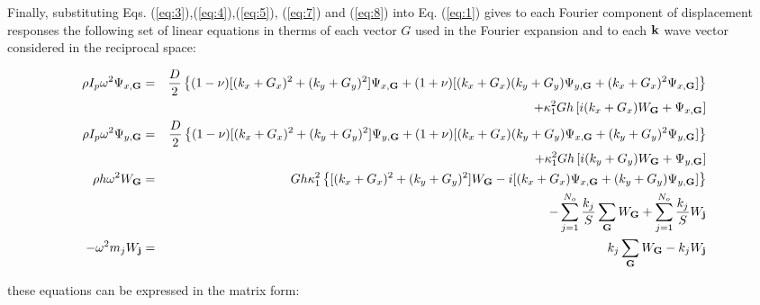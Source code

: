 \documentclass[a4paper]{ICEDyn}
\begin{document}
	Finally, substituting Eqs. (\ref{eq:3}),(\ref{eq:4}),(\ref{eq:5}), (\ref{eq:7}) and (\ref{eq:8}) into Eq. (\ref{eq:1}) gives to each Fourier component of displacement responses the following set of linear equations in therms of each vector $G$ used in the Fourier expansion and to each ${\bf k}$ wave vector considered in the reciprocal space:
	
	\begin{eqnarray}
	\rho I_p \omega^2\Psi_{x,{\bf G}}&=&  \frac{D}{2}\left\{(1-\nu)[(k_x+G_x)^2 + (k_y+G_y)^2] \Psi_{x,{\bf G}} + (1+\nu)[(k_x+G_x)(k_y+G_y) \Psi_{y,{\bf G}}+(k_x+G_x)^2\Psi_{x,{\bf G}}]\right\}
	\nonumber \\
	&&+\kappa_{1}^{2}Gh\left[ i(k_x + G_x)W_{{\bf G}}+\Psi_{x,{\bf G}} \right]\label{eq:9}\\ 
	\rho I_p\omega^2\Psi_{y,{\bf G}}&=& \frac{D}{2}\left\{ (1-\nu)[(k_x+G_x)^2+(k_y+G_y)^2]\Psi_{y,{\bf G}} + (1+\nu)[(k_x+G_x)(k_y+G_y) \Psi_{x,{\bf G}} + (k_y+G_y)^2\Psi_{y,{\bf G}}]\right\}\nonumber\\
	&&+\kappa_{1}^{2}Gh\left[i(k_y+G_y) W_{{\bf G}}+\Psi_{y,{\bf G}} \right]
	\label{eq:10}\\
	\rho h\omega^2W_{{\bf G}}&=&Gh\kappa_{1}^{2}\left\{[(k_x + G_x)^2+(k_y + G_y)^2]W_{{\bf G}} - i[(k_x + G_x)\Psi_{x,{\bf G}} + (k_y + G_y)\Psi_{y,{\bf G}}] \right\}\nonumber \\
	&&- \sum_{j=1}^{N_o}\frac{k_j}{S} \sum_{{ {\bf G}}} {W_{\bf G}} + \sum_{j=1}^{N_o}\frac{k_j}{S}{ W_{{\bf j}}}\label{eq:11}\\
    -\omega^2 m_j { W}_{\bf j} &=& k_j\sum_{{{\bf G}}} {W_{\bf G}} - k_j{W_{{\bf j}}}
	\end{eqnarray}
	
	these equations can be expressed in the matrix form: 
	
\end{document}
